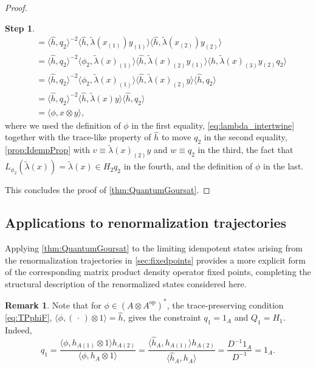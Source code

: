 \documentclass[a4paper,10pt]{amsart}
\newcommand{\eval}[2]{\langle #1 , #2\rangle}
\newcommand{\placeholder}{\,\cdot\,}
\theoremstyle{definition}
\newtheorem{step-goursat}{Step}
\newtheorem{remark}[theorem]{Remark}
\begin{document}
\begin{proof}
\begin{step-goursat}
\begin{align*}
    &=
    \eval{\hat{h}}{q_2}^{-2}
        \eval{\hat{h}}{\tilde{\lambda}(x_{(1)})y_{(1)}}
            \eval{\hat{h}}{\tilde{\lambda}(x_{(2)})y_{(2)}}
    \\
    &=
    \eval{\hat{h}}{q_2}^{-2}
        \eval{\phi_2}{\tilde{\lambda}(x)_{(1)}}
            \eval{\hat{h}}{\tilde{\lambda}(x)_{(2)}y_{(1)}}
                \eval{\hat{h}}{\tilde{\lambda}(x)_{(3)}y_{(2)} q_2}
    \\
    &=
        \eval{\hat{h}}{q_2}^{-2}
            \eval{\phi_2}{\tilde{\lambda}(x)_{(1)}}
                \eval{\hat{h}}{\tilde{\lambda}(x)_{(2)} y}
                    \eval{\hat{h}}{q_2}
    \\
    &=
        \eval{\hat{h}}{q_2}^{-2}
            \eval{\hat{h}}{\tilde\lambda(x) y}
                \eval{\hat{h}}{q_2}
    \\
    &=
    \eval{\phi}{x\otimes y},
\end{align*}
where we used the definition of $\phi$ in the first equality, \cref{eq:lambda_intertwine} together with the trace-like property of $\hat{h}$ to move $q_2$ in the second equality, \cref{prop:IdempProp} with $v\equiv \tilde{\lambda}(x)_{(2)}y$ and $w\equiv q_2$ in the third, the fact that $L_{\phi_2}(\tilde{\lambda}(x)) = \tilde{\lambda}(x)\in H_2 q_2$ in the fourth, and the definition of $\phi$ in the last.
\end{step-goursat}
\noindent%
This concludes the proof of \cref{thm:QuantumGoursat}.
\end{proof}

\subsection{Applications to renormalization trajectories}
Applying \cref{thm:QuantumGoursat} to the limiting idempotent states arising from the renormalization trajectories in \cref{sec:fixedpoints} provides a more explicit form of the corresponding matrix product density operator fixed points, completing the structural description of the renormalized states considered here.

\begin{remark}
    Note that for $\phi\in (A\otimes A^{\mathrm{op}})^*$, the trace-preserving condition \cref{eq:TPphiF},
    $
        \eval{\phi}{(\placeholder)\otimes 1} = \hat{h}
    $,
    gives the constraint $q_1=1_A$ and $Q_1=H_1$. Indeed,
    \[
    q_1=\frac{\eval{\phi}{h_{A(1)}\otimes 1} h_{A(2)}}{\eval{\phi}{h_A\otimes 1}}
    =\frac{\eval{\hat{h}_A}{h_{A(1)}}h_{A(2)}}{\eval{\hat{h}_A}{h_A}}=\frac{D^{-1}1_A}{D^{-1}}
    =1_A.
    \]
\end{remark}
\end{document}
